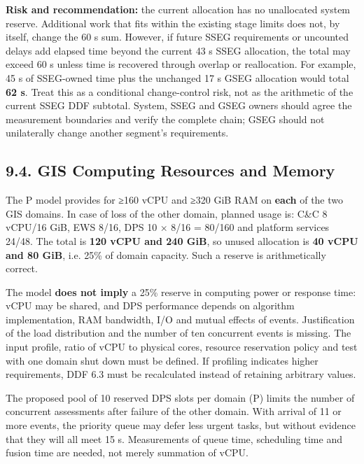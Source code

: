 \textbf{Risk and recommendation:} the current allocation has no unallocated system reserve. Additional work that fits within the existing stage limits does not, by itself, change the 60 s sum. However, if future SSEG requirements or uncounted delays add elapsed time beyond the current 43 s SSEG allocation, the total may exceed 60 s unless time is recovered through overlap or reallocation. For example, 45 s of SSEG-owned time plus the unchanged 17 s GSEG allocation would total \textbf{62 s}. Treat this as a conditional change-control risk, not as the arithmetic of the current SSEG DDF subtotal. System, SSEG and GSEG owners should agree the measurement boundaries and verify the complete chain; GSEG should not unilaterally change another segment's requirements.

\subsection{9.4. GIS Computing Resources and Memory}\label{ddjf-9-4}

The P model provides for ≥160 vCPU and ≥320 GiB RAM on \textbf{each} of the two GIS domains. In case of loss of the other domain, planned usage is: C\&C 8 vCPU/\allowbreak{}16 GiB, EWS 8/\allowbreak{}16, DPS 10 × 8/\allowbreak{}16 = 80/\allowbreak{}160 and platform services 24/\allowbreak{}48. The total is \textbf{120 vCPU and 240 GiB}, so unused allocation is \textbf{40 vCPU and 80 GiB}, i.e. 25\% of domain capacity. Such a reserve is arithmetically correct.

The model \textbf{does not imply} a 25\% reserve in computing power or response time: vCPU may be shared, and DPS performance depends on algorithm implementation, RAM bandwidth, I/\allowbreak{}O and mutual effects of events. Justification of the load distribution and the number of ten concurrent events is missing. The input profile, ratio of vCPU to physical cores, resource reservation policy and test with one domain shut down must be defined. If profiling indicates higher requirements, DDF 6.3 must be recalculated instead of retaining arbitrary values.

The proposed pool of 10 reserved DPS slots per domain (P) limits the number of concurrent assessments after failure of the other domain. With arrival of 11 or more events, the priority queue may defer less urgent tasks, but without evidence that they will all meet 15 s. Measurements of queue time, scheduling time and fusion time are needed, not merely summation of vCPU.

